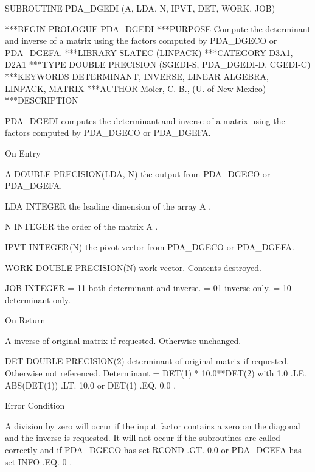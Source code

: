 \documentclass[11pt,twoside,nolof]{starlink}
\begin{document}


\begin{terminalv}
      SUBROUTINE PDA_DGEDI (A, LDA, N, IPVT, DET, WORK, JOB)


***BEGIN PROLOGUE  PDA_DGEDI
***PURPOSE  Compute the determinant and inverse of a matrix using the
            factors computed by PDA_DGECO or PDA_DGEFA.
***LIBRARY   SLATEC (LINPACK)
***CATEGORY  D3A1, D2A1
***TYPE      DOUBLE PRECISION (SGEDI-S, PDA_DGEDI-D, CGEDI-C)
***KEYWORDS  DETERMINANT, INVERSE, LINEAR ALGEBRA, LINPACK, MATRIX
***AUTHOR  Moler, C. B., (U. of New Mexico)
***DESCRIPTION

     PDA_DGEDI computes the determinant and inverse of a matrix
     using the factors computed by PDA_DGECO or PDA_DGEFA.

     On Entry

        A       DOUBLE PRECISION(LDA, N)
                the output from PDA_DGECO or PDA_DGEFA.

        LDA     INTEGER
                the leading dimension of the array  A .

        N       INTEGER
                the order of the matrix  A .

        IPVT    INTEGER(N)
                the pivot vector from PDA_DGECO or PDA_DGEFA.

        WORK    DOUBLE PRECISION(N)
                work vector.  Contents destroyed.

        JOB     INTEGER
                = 11   both determinant and inverse.
                = 01   inverse only.
                = 10   determinant only.

     On Return

        A       inverse of original matrix if requested.
                Otherwise unchanged.

        DET     DOUBLE PRECISION(2)
                determinant of original matrix if requested.
                Otherwise not referenced.
                Determinant = DET(1) * 10.0**DET(2)
                with  1.0 .LE. ABS(DET(1)) .LT. 10.0
                or  DET(1) .EQ. 0.0 .

     Error Condition

        A division by zero will occur if the input factor contains
        a zero on the diagonal and the inverse is requested.
        It will not occur if the subroutines are called correctly
        and if PDA_DGECO has set RCOND .GT. 0.0 or PDA_DGEFA has set
        INFO .EQ. 0 .


\end{terminalv}
\end{document}
